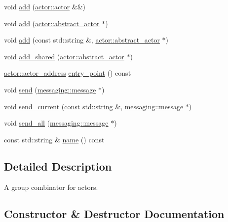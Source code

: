 \begin{DoxyCompactItemize}
\item 
void \hyperlink{classactor__zeta_1_1environment_1_1group_acf89235a108571370ee59b4a4c00bf13}{add} (\hyperlink{classactor__zeta_1_1actor_1_1actor}{actor\+::actor} \&\&)
\item 
void \hyperlink{classactor__zeta_1_1environment_1_1group_ac352dd63cc8d3bd54bff73487527d3f3}{add} (\hyperlink{classactor__zeta_1_1actor_1_1abstract__actor}{actor\+::abstract\+\_\+actor} $\ast$)
\item 
void \hyperlink{classactor__zeta_1_1environment_1_1group_aaccdf24ef556b75da7f479f40e140111}{add} (const std\+::string \&, \hyperlink{classactor__zeta_1_1actor_1_1abstract__actor}{actor\+::abstract\+\_\+actor} $\ast$)
\item 
void \hyperlink{classactor__zeta_1_1environment_1_1group_a68a9d396273cee1ec208bf8fc97aac97}{add\+\_\+shared} (\hyperlink{classactor__zeta_1_1actor_1_1abstract__actor}{actor\+::abstract\+\_\+actor} $\ast$)
\item 
\hyperlink{classactor__zeta_1_1actor_1_1actor__address}{actor\+::actor\+\_\+address} \hyperlink{classactor__zeta_1_1environment_1_1group_ade4f537649c75d6f1b1a9c37487fc2c1}{entry\+\_\+point} () const
\item 
void \hyperlink{classactor__zeta_1_1environment_1_1group_a05cebb494e0e660a75dc4299927be1fd}{send} (\hyperlink{classactor__zeta_1_1messaging_1_1message}{messaging\+::message} $\ast$)
\item 
void \hyperlink{classactor__zeta_1_1environment_1_1group_aa8ae92ceb3d037ed12c025fd4f1b7263}{send\+\_\+current} (const std\+::string \&, \hyperlink{classactor__zeta_1_1messaging_1_1message}{messaging\+::message} $\ast$)
\item 
void \hyperlink{classactor__zeta_1_1environment_1_1group_a93cd83622786c6436fd66f016f8acf22}{send\+\_\+all} (\hyperlink{classactor__zeta_1_1messaging_1_1message}{messaging\+::message} $\ast$)
\item 
const std\+::string \& \hyperlink{classactor__zeta_1_1environment_1_1group_a1ad7750f304b0c25e477c91fcc8e3030}{name} () const
\end{DoxyCompactItemize}


\subsection{Detailed Description}
A group combinator for actors. 

\subsection{Constructor \& Destructor Documentation}
\mbox{\label{classactor__zeta_1_1environment_1_1group_a406f197675df3a610f7f1f97d618fd8b}} 
